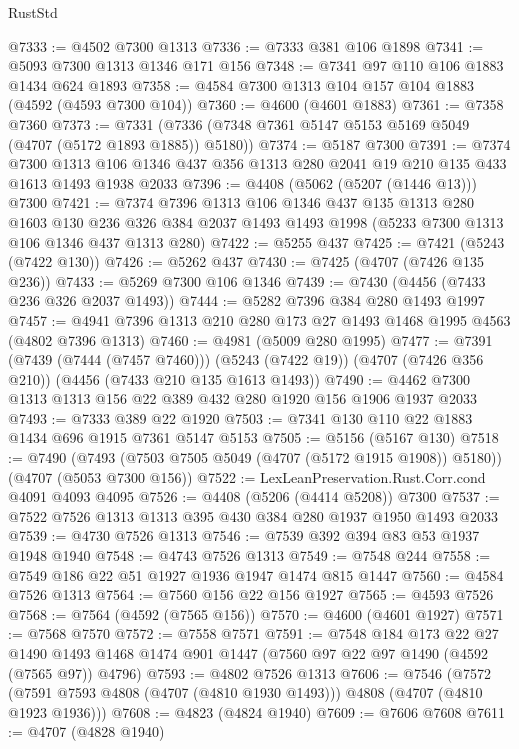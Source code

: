 \begin{lexlean}{RustStd}
\begin{coremodule}
@7333 := @4502 @7300 @1313
@7336 := @7333 @381 @106 @1898
@7341 := @5093 @7300 @1313 @1346 @171 @156
@7348 := @7341 @97 @110 @106 @1883 @1434 @624 @1893
@7358 := @4584 @7300 @1313 @104 @157 @104 @1883 (@4592 (@4593 @7300 @104))
@7360 := @4600 (@4601 @1883)
@7361 := @7358 @7360
@7373 := @7331 (@7336 (@7348 @7361 @5147 @5153 @5169 @5049 (@4707 (@5172 @1893 @1885)) @5180))
@7374 := @5187 @7300
@7391 := @7374
    @7300
    @1313
    @106
    @1346
    @437
    @356
    @1313
    @280
    @2041
    @19
    @210
    @135
    @433
    @1613
    @1493
    @1938
    @2033
@7396 := @4408 (@5062 (@5207 (@1446 @13))) @7300
@7421 := @7374
    @7396
    @1313
    @106
    @1346
    @437
    @135
    @1313
    @280
    @1603
    @130
    @236
    @326
    @384
    @2037
    @1493
    @1493
    @1998
    (@5233 @7300 @1313 @106 @1346 @437 @1313 @280)
@7422 := @5255 @437
@7425 := @7421 (@5243 (@7422 @130))
@7426 := @5262 @437
@7430 := @7425 (@4707 (@7426 @135 @236))
@7433 := @5269 @7300 @106 @1346
@7439 := @7430 (@4456 (@7433 @236 @326 @2037 @1493))
@7444 := @5282 @7396 @384 @280 @1493 @1997
@7457 := @4941 @7396 @1313 @210 @280 @173 @27 @1493 @1468 @1995 @4563 (@4802 @7396 @1313)
@7460 := @4981 (@5009 @280 @1995)
@7477 := @7391
    (@7439 (@7444 (@7457 @7460)))
    (@5243 (@7422 @19))
    (@4707 (@7426 @356 @210))
    (@4456 (@7433 @210 @135 @1613 @1493))
@7490 := @4462 @7300 @1313 @1313 @156 @22 @389 @432 @280 @1920 @156 @1906 @1937 @2033
@7493 := @7333 @389 @22 @1920
@7503 := @7341 @130 @110 @22 @1883 @1434 @696 @1915 @7361 @5147 @5153
@7505 := @5156 (@5167 @130)
@7518 := @7490
    (@7493 (@7503 @7505 @5049 (@4707 (@5172 @1915 @1908)) @5180))
    (@4707 (@5053 @7300 @156))
@7522 := LexLeanPreservation.Rust.Corr.cond @4091 @4093 @4095
@7526 := @4408 (@5206 (@4414 @5208)) @7300
@7537 := @7522 @7526 @1313 @1313 @395 @430 @384 @280 @1937 @1950 @1493 @2033
@7539 := @4730 @7526 @1313
@7546 := @7539 @392 @394 @83 @53 @1937 @1948 @1940
@7548 := @4743 @7526 @1313
@7549 := @7548 @244
@7558 := @7549 @186 @22 @51 @1927 @1936 @1947 @1474 @815 @1447
@7560 := @4584 @7526 @1313
@7564 := @7560 @156 @22 @156 @1927
@7565 := @4593 @7526
@7568 := @7564 (@4592 (@7565 @156))
@7570 := @4600 (@4601 @1927)
@7571 := @7568 @7570
@7572 := @7558 @7571
@7591 := @7548
    @184
    @173
    @22
    @27
    @1490
    @1493
    @1468
    @1474
    @901
    @1447
    (@7560 @97 @22 @97 @1490 (@4592 (@7565 @97)) @4796)
@7593 := @4802 @7526 @1313
@7606 := @7546
    (@7572 (@7591 @7593 @4808 (@4707 (@4810 @1930 @1493))) @4808 (@4707 (@4810 @1923 @1936)))
@7608 := @4823 (@4824 @1940)
@7609 := @7606 @7608
@7611 := @4707 (@4828 @1940)

\end{coremodule}
\end{lexlean}
